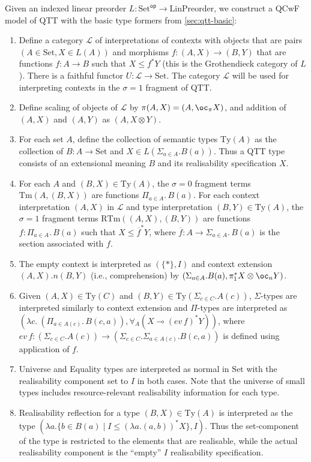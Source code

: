 \documentclass[acmsmall,screen]{acmart}
\newcommand{\Ty}{\mathrm{Ty}}
\newcommand{\RTm}{\mathrm{RTm}}
\newcommand{\Tm}{\mathrm{Tm}}
\newcommand{\Set}{\mathrm{Set}}
\newcommand{\cat}[1]{\mathcal{#1}}
\newcommand{\op}{\mathsf{op}}
\newcommand{\LinPreorder}{\mathrm{LinPreorder}}
\begin{document}
Given an indexed linear preorder $L : \Set^\op \to \LinPreorder$, we
construct a QCwF model of QTT with the basic type formers from
\autoref{sec:qtt-basic}:
\begin{enumerate}
\item Define a category $\cat{L}$ of interpretations of contexts with
  objects that are pairs $(A \in \Set, X \in L(A))$ and morphisms
  $f : (A,X) \to (B, Y)$ that are functions $f : A \to B$ such that
  $X \leq f^*Y$ (this is the Grothendieck category of $L$). There is a
  faithful functor $U : \cat{L} \to \Set$. The category $\cat{L}$ will
  be used for interpreting contexts in the $\sigma = 1$ fragment of
  QTT.
\item Define scaling of objects of $\cat{L}$ by
  $\pi(A,X) = (A, \oc_\pi X)$, and addition of $(A, X)$ and $(A, Y)$
  as $(A, X \otimes Y)$.
\item For each set $A$, define the collection of semantic types
  $\Ty(A)$ as the collection of $B : A \to \Set$ and
  $X \in L(\Sigma_{a \in A}.B(a))$. Thus a QTT type consists of an
  extensional meaning $B$ and its realisability specification $X$.
\item For each $A$ and $(B,X) \in \Ty(A)$, the $\sigma = 0$ fragment
  terms $\Tm(A,(B,X))$ are functions $\Pi_{a \in A}.\,B(a)$. For each
  context interpretation $(A, X)$ in $\cat{L}$ and type interpretation
  $(B,Y) \in \Ty(A)$, the $\sigma = 1$ fragment terms
  $\RTm((A,X),(B,Y))$ are functions $f : \Pi_{a \in A}.\,B(a)$ such
  that $X \leq \overline{f}^*Y$, where
  $\overline{f} : A \to \Sigma_{a \in A}.\,B(a)$ is the section
  associated with $f$.
\item The empty context is interpreted as $(\{*\}, I)$ and context
  extension $(A,X).n(B,Y)$ (i.e., comprehension) by
  $(\Sigma_{a \in A}.B(a), \pi_1^* X \otimes \oc_n Y)$.
\item Given $(A,X) \in \Ty(C)$ and
  $(B,Y) \in \Ty(\Sigma_{c \in C}.A(c))$, $\Sigma$-types are
  interpreted similarly to context extension and $\Pi$-types are
  interpreted as
  $(\lambda c.~(\Pi_{a \in A(c)}.\,B(c,a)), \forall_{A}(X \multimap
  (\mathit{ev}\,f)^*Y))$, where
  $\mathit{ev}\,f : (\Sigma_{c \in C}.A(c)) \to (\Sigma_{c \in
    C}.\Sigma_{a \in A(c)}.B(c,a))$ is defined using application of
  $f$.
\item Universe and Equality types are interpreted as normal in $\Set$
  with the realisability component set to $I$ in both cases. Note that
  the universe of small types includes resource-relevant realisability
  information for each type.
\item Realisability reflection for a type $(B,X) \in \Ty(A)$ is
  interpreted as the type
  $(\lambda a. \{ b \in B(a) \mid I \leq (\lambda a. (a,b))^*X \},
  I)$. Thus the set-component of the type is restricted to the
  elements that are realisable, while the actual realisability
  component is the ``empty'' $I$ realisability specification.
\end{enumerate}
\end{document}
